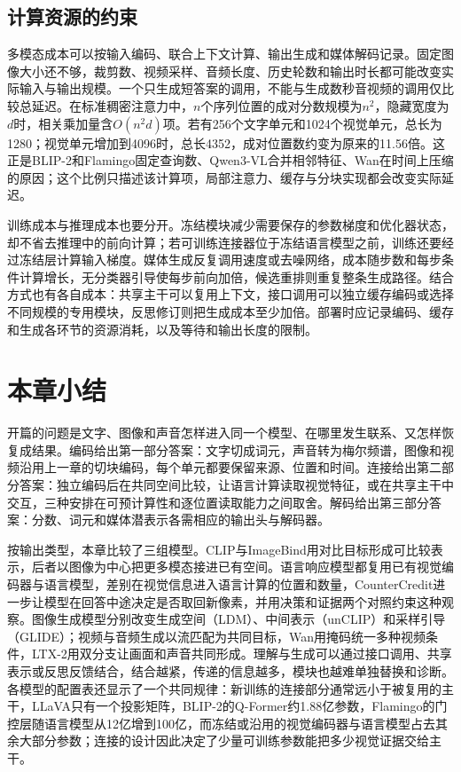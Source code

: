 \subsection{计算资源的约束}
\label{sec:vision-models-cost}

多模态成本可以按输入编码、联合上下文计算、输出生成和媒体解码记录。固定图像大小还不够，裁剪数、视频采样、音频长度、历史轮数和输出时长都可能改变实际输入与输出规模。一个只生成短答案的调用，不能与生成数秒音视频的调用仅比较总延迟。在标准稠密注意力中，$n$个序列位置的成对分数规模为$n^2$，隐藏宽度为$d$时，相关乘加量含$O(n^2d)$项。若有256个文字单元和1024个视觉单元，总长为1280；视觉单元增加到4096时，总长4352，成对位置数约变为原来的11.56倍。这正是BLIP-2和Flamingo固定查询数、Qwen3-VL合并相邻特征、Wan在时间上压缩的原因；这个比例只描述该计算项，局部注意力、缓存与分块实现都会改变实际延迟。

训练成本与推理成本也要分开。冻结模块减少需要保存的参数梯度和优化器状态，却不省去推理中的前向计算；若可训练连接器位于冻结语言模型之前，训练还要经过冻结层计算输入梯度。媒体生成反复调用速度或去噪网络，成本随步数和每步条件计算增长，无分类器引导使每步前向加倍，候选重排则重复整条生成路径。结合方式也有各自成本：共享主干可以复用上下文，接口调用可以独立缓存编码或选择不同规模的专用模块，反思修订则把生成成本至少加倍。部署时应记录编码、缓存和生成各环节的资源消耗，以及等待和输出长度的限制。

\section{本章小结}
\label{sec:vision-models-summary}

开篇的问题是文字、图像和声音怎样进入同一个模型、在哪里发生联系、又怎样恢复成结果。编码给出第一部分答案：文字切成词元，声音转为梅尔频谱，图像和视频沿用上一章的切块编码，每个单元都要保留来源、位置和时间。连接给出第二部分答案：独立编码后在共同空间比较，让语言计算读取视觉特征，或在共享主干中交互，三种安排在可预计算性和逐位置读取能力之间取舍。解码给出第三部分答案：分数、词元和媒体潜表示各需相应的输出头与解码器。

按输出类型，本章比较了三组模型。CLIP与ImageBind用对比目标形成可比较表示，后者以图像为中心把更多模态接进已有空间。语言响应模型都复用已有视觉编码器与语言模型，差别在视觉信息进入语言计算的位置和数量，CounterCredit进一步让模型在回答中途决定是否取回新像素，并用决策和证据两个对照约束这种观察。图像生成模型分别改变生成空间（LDM）、中间表示（unCLIP）和采样引导（GLIDE）；视频与音频生成以流匹配为共同目标，Wan用掩码统一多种视频条件，LTX-2用双分支让画面和声音共同形成。理解与生成可以通过接口调用、共享表示或反思反馈结合，结合越紧，传递的信息越多，模块也越难单独替换和诊断。各模型的配置表还显示了一个共同规律：新训练的连接部分通常远小于被复用的主干，LLaVA只有一个投影矩阵，BLIP-2的Q-Former约1.88亿参数，Flamingo的门控层随语言模型从12亿增到100亿，而冻结或沿用的视觉编码器与语言模型占去其余大部分参数；连接的设计因此决定了少量可训练参数能把多少视觉证据交给主干。

